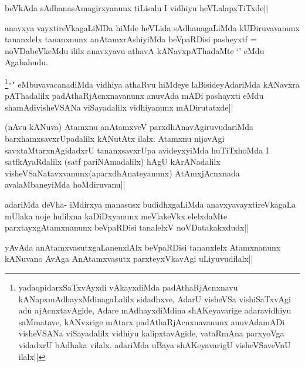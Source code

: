 \begin{artha}
beVkAda sAdhanasAmagirxyanunx tiLisalu I vidhiyu heVLalapxTiTxde||
\end{artha}

\begin{artha}
anavxya vayxtireVkagaLiMDa hiMde heVLida sAdhanagaLiMda kUDiruvavanunx tananxlelx tananxnunx anAtamxrAshiyiMda beVpaRDisi pasheyxtf = noVDabeVkeMdu ililx anavxyavu athavA kANavxpAThadaMte `\stext' eMdu Agabahudu.
\end{artha}

\begin{artha}
\footnote{yadaqpidarxSaTxvAyxdi vAkayxdiMda padAthaRjAcnxnavu kANapxmAdhayxMdinagaLalilx sidadhxve, AdarU visheVSa vishiSaTxvAgi adu ajAcnxtavAgide, Adare mAdhayxdiMdina shAKeyavarige adaravidhiyu saMmatave, kANvxrige mAtarx padAthaRjAcnxnavanunx anuvAdamADi visheVSANa viSayadalilx vidhiyu kalipxtavAgide, vataRmAna parxyoVga vidadxrU bAdhaka vilalx. adariMda uBaya shAKeyavarigU visheVSaveVnU ilalx||}``\stext" eMbuvavacanadiMda vidhiya athaRvu hiMdeye laBisideyAdariMda kANavxra pAThadalilx padAthaRjAcnxnavanunx anuvAda mADi pashayxti eMdu shamAdivisheVSANa viSayadalilx vidhiyanunx mADirutatxde||
\end{artha}


\begin{artha}
(nAvu kANuva) Atamxnu anAtamxveV parxdhAnavAgiruvudariMda barxhamxsavxrUpadalilx kANutAtx ilalx. Atamxnu nijavAgi savxtaMtarxnAgidadxrU tananxsavxrUpa avideyxyiMda huTiTxhoMda I satfkAyaRdalilx (satf pariNAmadalilx) hAgU kArANadalilx visheVSaNatavxvanunx(aparxdhAnateyanunx) AtAmxjAcnxnada avalaMbaneyiMda hoMdiruvanu||
\end{artha}


\begin{artha}
adariMda deVha- iMdirxya manasusx budidhxgaLiMda anavxyavayxtireVkagaLa mUlaka noje hulilxna kaDiDxyanunx meVlakeVkx elelxdaMte parxtayxgAtamxnanunx beVpaRDisi tanalelxV noVDatakakxdudx||
\end{artha}

\begin{artha}
yAvAda anAtamxvasutxgaLanenxlAlx beVpaRDisi tananxlelx Atamxnanunx kANuvano AvAga AnAtamxvasutx parxteyxVkavAgi uLiyuvudilalx||
\end{artha}

